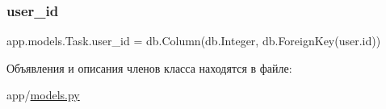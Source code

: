 \mbox{\label{classapp_1_1models_1_1_task_a72b3ad4ca2c7c9d47262523bc91526ae}} 
\subsubsection{\texorpdfstring{user\+\_\+id}{user\_id}}
{\footnotesize\ttfamily app.\+models.\+Task.\+user\+\_\+id = db.\+Column(db.\+Integer, db.\+Foreign\+Key(\textquotesingle{}user.\+id\textquotesingle{}))\hspace{0.3cm}{\ttfamily [static]}}



Объявления и описания членов класса находятся в файле\+:\begin{DoxyCompactItemize}
\item 
app/\mbox{\hyperlink{models_8py}{models.\+py}}\end{DoxyCompactItemize}
